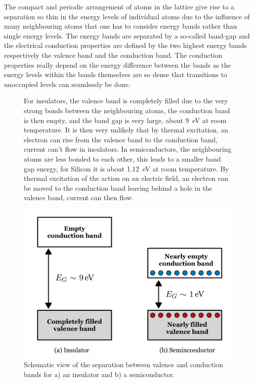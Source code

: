 		The compact and periodic arrangement of atoms in the lattice give rise to a separation so thin in the energy levels of individual atoms due to the influence of many neighbouring atoms that one has to consider energy bands rather than single energy levels. The energy bands are separated by a so-called band-gap and the electrical conduction properties are defined by the two highest energy bands respectively the valence band and the conduction band. The conduction properties really depend on the energy difference between the bands as the energy levels within the bands themselves are so dense that transitions to unoccupied levels can seamlessly be done.
		\begin{figure}[h]
		\begin{minipage}{0.49\linewidth}
		For insulators, the valence band is completely filled due to the very strong bonds between the neighbouring atoms, the conduction band is then empty, and the band gap is very large, about \SI{9}{\electronvolt} at room temperature. It is then very unlikely that by thermal excitation, an electron can rise from the valence band to the conduction band, current can't flow in insulators. In semiconductors, the neighbouring atoms are less bonded to each other, this leads to a smaller band gap energy, for Silicon it is about \SI{1.12}{\electronvolt} at room temperature. By thermal excitation of the action on an electric field, an electron can be moved to the conduction band leaving behind a hole in the valence band, current can then flow. 

		\end{minipage}\hfill
		\begin{minipage}{0.49\linewidth}
		\centering
		\includegraphics[width=1.0\linewidth]{files/energybands_insu_semi}
		\caption{Schematic view of the separation between valence and conduction bands for a) an insulator and b) a semiconductor.}
		\label{ }
		\end{minipage}
		\end{figure}

